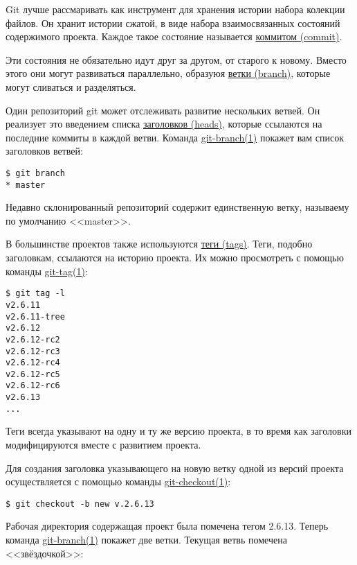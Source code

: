 \documentclass[a4paper, 12pt]{report}
\begin{document}
Git лучше рассмаривать как инструмент для хранения истории набора колекции файлов.
Он хранит истории сжатой, в виде набора взаимосвязанных состояний содержимого
проекта. Каждое такое состояние называется \href{#def_commit}{коммитом (commit)}.

Эти состояния не обязательно идут друг за другом, от старого к новому. Вместо этого
они могут развиваться параллельно, образуюя \href{#def_branch}{ветки (branch)},
которые могут сливаться и разделяться.

Один репозиторий git может отслеживать развитие нескольких ветвей. Он реализует это
введением списка \href{#def_head}{заголовков (heads)}, которые ссылаются на
последние коммиты в каждой ветви. Команда \href{http://www.kernel.org/pub/software/scm/git/docs/git-branch.html}{git-branch(1)}
покажет вам список заголовков ветвей:

\begin{lstlisting}
$ git branch
* master
\end{lstlisting}

Недавно склонированный репозиторий содержит единственную ветку, называему по умолчанию
<<master>>.

В большинстве проектов также используются \href{#def_tag}{теги (tags)}. Теги, подобно
заголовкам, ссылаются на историю проекта. Их можно просмотреть с помощью команды
\href{http://www.kernel.org/pub/software/scm/git/docs/git-tag.html}{git-tag(1)}:

\begin{lstlisting}
$ git tag -l
v2.6.11
v2.6.11-tree
v2.6.12
v2.6.12-rc2
v2.6.12-rc3
v2.6.12-rc4
v2.6.12-rc5
v2.6.12-rc6
v2.6.13
...
\end{lstlisting}

Теги всегда указывают на одну и ту же версию проекта, в то время как заголовки
модифицируются вместе с развитием проекта.

Для создания заголовка указывающего на новую ветку одной из версий проекта
осуществляется с помощью команды
\href{http://www.kernel.org/pub/software/scm/git/docs/git-checkout.html}{git-checkout(1)}:

\begin{lstlisting}
$ git checkout -b new v.2.6.13
\end{lstlisting}

Рабочая директория содержащая проект была помечена тегом 2.6.13. Теперь команда
\href{http://www.kernel.org/pub/software/scm/git/docs/git-branch.html}{git-branch(1)}
покажет две ветки. Текущая ветвь помечена <<звёздочкой>>:
\end{document}

